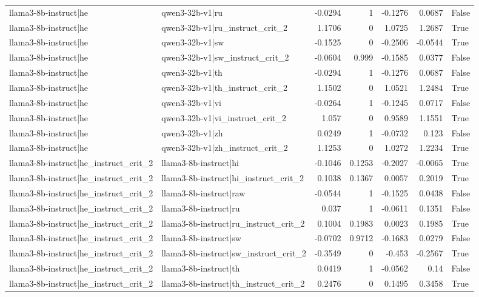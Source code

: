\begin{table}
\begin{tabular}{l l r r r r l}
llama3-8b-instruct|he & qwen3-32b-v1|ru & -0.0294 & 1 & -0.1276 & 0.0687 & False \\
llama3-8b-instruct|he & qwen3-32b-v1|ru_instruct_crit_2 & 1.1706 & 0 & 1.0725 & 1.2687 & True \\
llama3-8b-instruct|he & qwen3-32b-v1|sw & -0.1525 & 0 & -0.2506 & -0.0544 & True \\
llama3-8b-instruct|he & qwen3-32b-v1|sw_instruct_crit_2 & -0.0604 & 0.999 & -0.1585 & 0.0377 & False \\
llama3-8b-instruct|he & qwen3-32b-v1|th & -0.0294 & 1 & -0.1276 & 0.0687 & False \\
llama3-8b-instruct|he & qwen3-32b-v1|th_instruct_crit_2 & 1.1502 & 0 & 1.0521 & 1.2484 & True \\
llama3-8b-instruct|he & qwen3-32b-v1|vi & -0.0264 & 1 & -0.1245 & 0.0717 & False \\
llama3-8b-instruct|he & qwen3-32b-v1|vi_instruct_crit_2 & 1.057 & 0 & 0.9589 & 1.1551 & True \\
llama3-8b-instruct|he & qwen3-32b-v1|zh & 0.0249 & 1 & -0.0732 & 0.123 & False \\
llama3-8b-instruct|he & qwen3-32b-v1|zh_instruct_crit_2 & 1.1253 & 0 & 1.0272 & 1.2234 & True \\
llama3-8b-instruct|he_instruct_crit_2 & llama3-8b-instruct|hi & -0.1046 & 0.1253 & -0.2027 & -0.0065 & True \\
llama3-8b-instruct|he_instruct_crit_2 & llama3-8b-instruct|hi_instruct_crit_2 & 0.1038 & 0.1367 & 0.0057 & 0.2019 & True \\
llama3-8b-instruct|he_instruct_crit_2 & llama3-8b-instruct|raw & -0.0544 & 1 & -0.1525 & 0.0438 & False \\
llama3-8b-instruct|he_instruct_crit_2 & llama3-8b-instruct|ru & 0.037 & 1 & -0.0611 & 0.1351 & False \\
llama3-8b-instruct|he_instruct_crit_2 & llama3-8b-instruct|ru_instruct_crit_2 & 0.1004 & 0.1983 & 0.0023 & 0.1985 & True \\
llama3-8b-instruct|he_instruct_crit_2 & llama3-8b-instruct|sw & -0.0702 & 0.9712 & -0.1683 & 0.0279 & False \\
llama3-8b-instruct|he_instruct_crit_2 & llama3-8b-instruct|sw_instruct_crit_2 & -0.3549 & 0 & -0.453 & -0.2567 & True \\
llama3-8b-instruct|he_instruct_crit_2 & llama3-8b-instruct|th & 0.0419 & 1 & -0.0562 & 0.14 & False \\
llama3-8b-instruct|he_instruct_crit_2 & llama3-8b-instruct|th_instruct_crit_2 & 0.2476 & 0 & 0.1495 & 0.3458 & True \\

\end{tabular}
\end{table}

